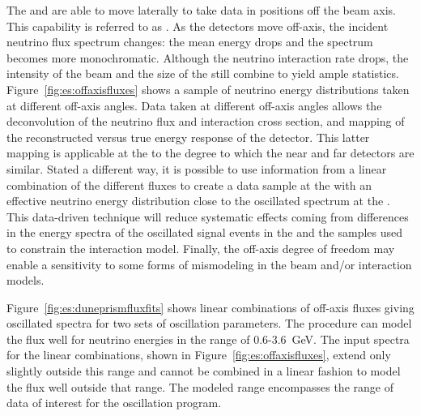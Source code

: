 The  and  %
are able to move laterally to take data in positions off the beam axis.  This capability is referred to as . As the detectors move off-axis, the incident neutrino flux spectrum changes:    the mean energy drops and the spectrum becomes more monochromatic.  Although the neutrino interaction rate drops, the intensity of the beam and the size of the  still combine to yield ample statistics. %
Figure~\ref{fig:es:offaxisfluxes} shows a sample of neutrino energy distributions taken at different off-axis angles.
%
Data taken at different off-axis angles allows the deconvolution of the neutrino flux and interaction cross section, and mapping of the reconstructed versus true energy response of the detector.  This latter mapping is applicable at the  to the degree to which the near and far  detectors are similar.  Stated a different way, it is possible to use information from a linear combination of the different fluxes to create a data sample at the  with an effective neutrino energy distribution close to the oscillated spectrum at the .  This data-driven technique will reduce systematic effects coming from differences in the energy spectra of the oscillated signal events in the  and the  samples used to constrain the interaction model. Finally, the off-axis degree of freedom may enable a sensitivity to some forms of mismodeling in the beam and/or interaction models. %

Figure~\ref{fig:es:duneprismfluxfits} shows linear combinations of off-axis fluxes giving  oscillated spectra for two sets of oscillation parameters. The procedure can model the  flux well for neutrino energies in the range of 0.6-3.6~GeV. The input spectra for the linear combinations, shown in Figure~\ref{fig:es:offaxisfluxes}, extend only slightly outside this range and cannot be combined in a linear fashion to model the flux well outside that range. The modeled range encompasses the range of data of interest for the oscillation program.   



